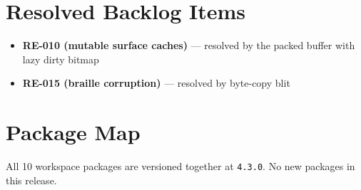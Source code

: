 \section{Resolved Backlog Items}\label{record-277-resolved-backlog-items}

\begin{itemize}
\tightlist
\item
  \textbf{RE-010 (mutable surface caches)} --- resolved by the packed buffer with lazy dirty bitmap
\item
  \textbf{RE-015 (braille corruption)} --- resolved by byte-copy blit
\end{itemize}

\section{Package Map}\label{record-277-package-map}

All 10 workspace packages are versioned together at \texttt{4\allowbreak{}.\allowbreak{}3\allowbreak{}.\allowbreak{}0}. No new packages in this release.

